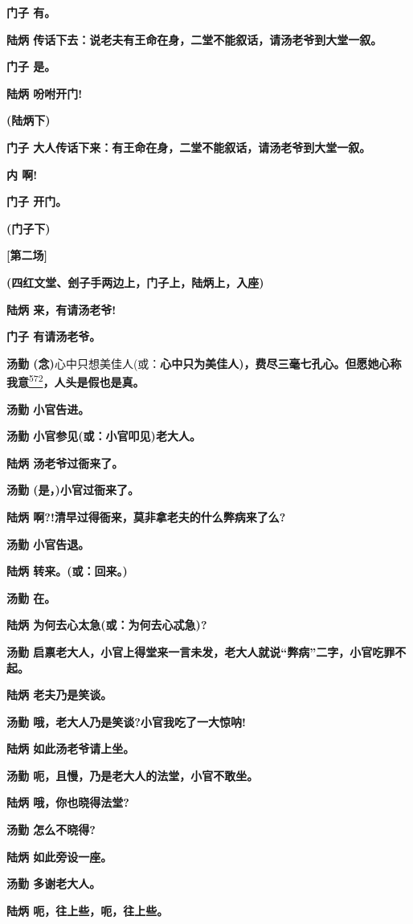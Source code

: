 \textbf{门子 有。}

\textbf{陆炳
传话下去：说老夫有王命在身，二堂不能叙话，请汤老爷到大堂一叙。}

\textbf{门子 是。}

\textbf{陆炳 吩咐开门!}

\textbf{(陆炳下)}

\textbf{门子
大人传话下来：有王命在身，二堂不能叙话，请汤老爷到大堂一叙。}

\textbf{内 啊!}

\textbf{门子 开门。}

\textbf{(门子下)}

\textbf{{[}第二场{]}}

\textbf{(四红文堂、刽子手两边上，门子上，陆炳上，入座)}

\textbf{陆炳 来，有请汤老爷!}

\textbf{门子 有请汤老爷。}

\textbf{汤勤
(念)}心中只想美佳人(或：\textbf{心中只为美佳人)，费尽三毫七孔心。但愿她心称我意}\protect\hyperlink{fn572}{\textsuperscript{572}}\textbf{，人头是假也是真。}

\textbf{汤勤 小官告进。}

\textbf{汤勤 小官参见(或：小官叩见)老大人。}

\textbf{陆炳 汤老爷过衙来了。}

\textbf{汤勤 (是，)小官过衙来了。}

\textbf{陆炳 啊?!清早过得衙来，莫非拿老夫的什么弊病来了么?}

\textbf{汤勤 小官告退。}

\textbf{陆炳 转来。(或：回来。)}

\textbf{汤勤 在。}

\textbf{陆炳 为何去心太急(或：为何去心忒急)?}

\textbf{汤勤
启禀老大人，小官上得堂来一言未发，老大人就说``弊病''二字，小官吃罪不起。}

\textbf{陆炳 老夫乃是笑谈。}

\textbf{汤勤 哦，老大人乃是笑谈?小官我吃了一大惊呐!}

\textbf{陆炳 如此汤老爷请上坐。}

\textbf{汤勤 呃，且慢，乃是老大人的法堂，小官不敢坐。}

\textbf{陆炳 哦，你也晓得法堂?}

\textbf{汤勤 怎么不晓得?}

\textbf{陆炳 如此旁设一座。}

\textbf{汤勤 多谢老大人。}

\textbf{陆炳 呃，往上些，呃，往上些。}

